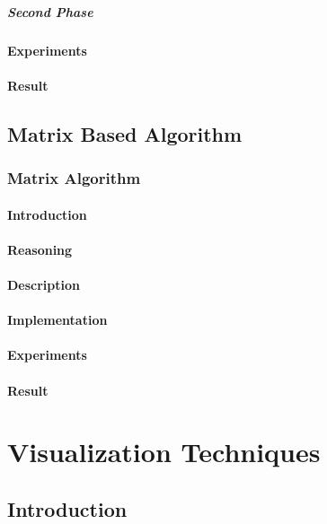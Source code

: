 \paragraph{Second Phase}

\subsubsection{Experiments}
\cite{githubtest1}
\subsubsection{Result}

\section{Matrix Based Algorithm}
\subsection{Matrix Algorithm}
\subsubsection{Introduction}
\subsubsection{Reasoning}
\subsubsection{Description}
\subsubsection{Implementation}
\subsubsection{Experiments}
\subsubsection{Result}

\chapter{Visualization Techniques}

\section{Introduction}

